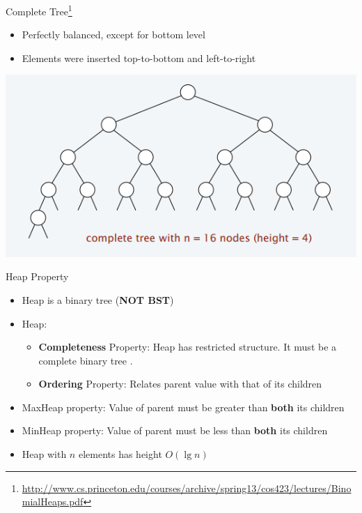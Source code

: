 \documentclass{beamer}
\begin{document}
\begin{frame}{Complete Tree\footnote{\url{http://www.cs.princeton.edu/courses/archive/spring13/cos423/lectures/BinomialHeaps.pdf}}}
    \begin{itemize}
        \item Perfectly balanced, except for bottom level
        \item Elements were inserted top-to-bottom and left-to-right
    \end{itemize}
    \begin{center}
        \includegraphics[scale=0.4]{completeTreeEg.png}
    \end{center}
\end{frame}

\begin{frame}{Heap Property}
    \begin{itemize}
        \item Heap is a binary tree ({\bf NOT BST})
        \item Heap:
        \begin{itemize}
            \item {\bf Completeness} Property: Heap has restricted structure. It must be a complete binary tree . 
            \item {\bf Ordering} Property: Relates parent value with that of its children
        \end{itemize}
        \item MaxHeap property: Value of parent must be greater than {\bf both} its children
        \item MinHeap property: Value of parent must be less than {\bf both} its children
        \item Heap with $n$ elements has height $O(\lg n)$
    \end{itemize}
\end{frame}
\end{document}
